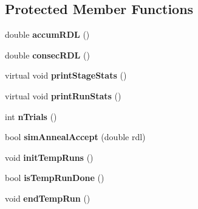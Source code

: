 \subsection*{Protected Member Functions}
\begin{DoxyCompactItemize}
\item 
\hypertarget{class_k_mlocal_hybrid_a44afe4751528ba819c9f0caf1e3884fb}{
double {\bfseries accumRDL} ()}
\label{class_k_mlocal_hybrid_a44afe4751528ba819c9f0caf1e3884fb}

\item 
\hypertarget{class_k_mlocal_hybrid_a785445d196288dcf235bda830a5e034f}{
double {\bfseries consecRDL} ()}
\label{class_k_mlocal_hybrid_a785445d196288dcf235bda830a5e034f}

\item 
\hypertarget{class_k_mlocal_hybrid_a33f8fde4a390dd5fa4c64c1369ef57a3}{
virtual void {\bfseries printStageStats} ()}
\label{class_k_mlocal_hybrid_a33f8fde4a390dd5fa4c64c1369ef57a3}

\item 
\hypertarget{class_k_mlocal_hybrid_a46dc980b79e4587609a30131163040f5}{
virtual void {\bfseries printRunStats} ()}
\label{class_k_mlocal_hybrid_a46dc980b79e4587609a30131163040f5}

\item 
\hypertarget{class_k_mlocal_hybrid_add10f55c94b2d37d3356d04da8e91922}{
int {\bfseries nTrials} ()}
\label{class_k_mlocal_hybrid_add10f55c94b2d37d3356d04da8e91922}

\item 
\hypertarget{class_k_mlocal_hybrid_a589d7752f03ca62f4b73365b0260dd1e}{
bool {\bfseries simAnnealAccept} (double rdl)}
\label{class_k_mlocal_hybrid_a589d7752f03ca62f4b73365b0260dd1e}

\item 
\hypertarget{class_k_mlocal_hybrid_a299d57b378c231909b6dfbe2db19a672}{
void {\bfseries initTempRuns} ()}
\label{class_k_mlocal_hybrid_a299d57b378c231909b6dfbe2db19a672}

\item 
\hypertarget{class_k_mlocal_hybrid_ad20287a1ee31b7a3864c9240f3d71953}{
bool {\bfseries isTempRunDone} ()}
\label{class_k_mlocal_hybrid_ad20287a1ee31b7a3864c9240f3d71953}

\item 
\hypertarget{class_k_mlocal_hybrid_a85e21e5df165e0646c16acc42c69a68e}{
void {\bfseries endTempRun} ()}
\label{class_k_mlocal_hybrid_a85e21e5df165e0646c16acc42c69a68e}


\end{DoxyCompactItemize}
